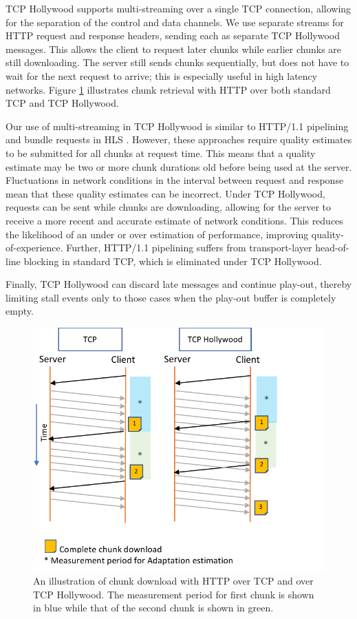 TCP Hollywood supports multi-streaming over a single TCP connection, allowing for the
separation of the control and data channels. We use separate streams for HTTP request and
response headers, sending each as separate TCP Hollywood messages. This allows the client
to request later chunks while earlier chunks are still downloading. The server still sends
chunks sequentially, but does not have to wait for the next request to arrive; this is
especially useful in high latency networks. Figure \ref{fig:hollywood_download}
illustrates chunk retrieval with HTTP over both standard TCP and TCP Hollywood.

Our use of multi-streaming in TCP Hollywood is similar to HTTP/1.1 pipelining and bundle
requests in HLS \cite{muller2012evaluation}. However, these approaches require quality
estimates to be submitted for all chunks at request time. This means that a quality
estimate may be two or more chunk durations old before being used at the server.
Fluctuations in network conditions in the interval between request and response mean that
these quality estimates can be incorrect. Under TCP Hollywood, requests can be sent while
chunks are downloading, allowing for the server to receive a more recent and accurate
estimate of network conditions. This reduces the likelihood of an under or over estimation
of performance, improving quality-of-experience. Further, HTTP/1.1 pipelining suffers
from transport-layer head-of-line blocking in standard TCP, which is eliminated under TCP Hollywood.

Finally, TCP Hollywood can discard late messages and continue play-out,
thereby limiting stall events only to those cases when the play-out buffer is completely
empty.

\begin{figure}
    \centering
    \includegraphics[width=\columnwidth]{figures/tcph-download.pdf}
    \caption{An illustration of chunk download with HTTP over TCP and over TCP Hollywood. The measurement period for first chunk is shown in blue while that of the second chunk is shown in green. }
    \label{fig:hollywood_download}
\end{figure}

